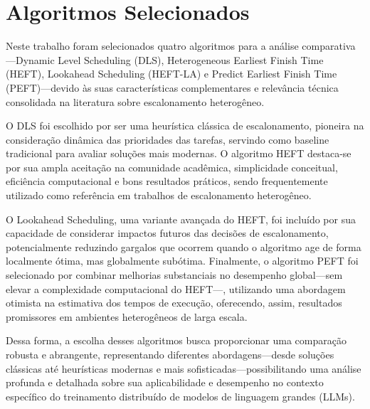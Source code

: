 \documentclass[12pt, %
openright, 
oneside, %
a4paper,    %
brazil]{facom-ufu-abntex2}
\begin{document}
\section{Algoritmos Selecionados}
Neste trabalho foram selecionados quatro algoritmos para a análise comparativa—Dynamic Level Scheduling (DLS), Heterogeneous Earliest Finish Time (HEFT), Lookahead Scheduling (HEFT-LA) e Predict Earliest Finish Time (PEFT)—devido às suas características complementares e relevância técnica consolidada na literatura sobre escalonamento heterogêneo.

O DLS foi escolhido por ser uma heurística clássica de escalonamento, pioneira na consideração dinâmica das prioridades das tarefas, servindo como baseline tradicional para avaliar soluções mais modernas. O algoritmo HEFT destaca-se por sua ampla aceitação na comunidade acadêmica, simplicidade conceitual, eficiência computacional e bons resultados práticos, sendo frequentemente utilizado como referência em trabalhos de escalonamento heterogêneo.

O Lookahead Scheduling, uma variante avançada do HEFT, foi incluído por sua capacidade de considerar impactos futuros das decisões de escalonamento, potencialmente reduzindo gargalos que ocorrem quando o algoritmo age de forma localmente ótima, mas globalmente subótima. Finalmente, o algoritmo PEFT foi selecionado por combinar melhorias substanciais no desempenho global—sem elevar a complexidade computacional do HEFT—, utilizando uma abordagem otimista na estimativa dos tempos de execução, oferecendo, assim, resultados promissores em ambientes heterogêneos de larga escala.

Dessa forma, a escolha desses algoritmos busca proporcionar uma comparação robusta e abrangente, representando diferentes abordagens—desde soluções clássicas até heurísticas modernas e mais sofisticadas—possibilitando uma análise profunda e detalhada sobre sua aplicabilidade e desempenho no contexto específico do treinamento distribuído de modelos de linguagem grandes (LLMs).
\end{document}
